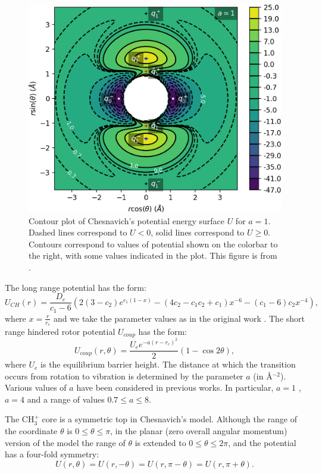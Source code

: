 \documentclass[a4paper]{article}
\begin{document}
\begin{figure}[ht]
 \centering
 \includegraphics[width=.5\textwidth]{figure1}
 \caption{Contour plot of Chesnavich's potential energy surface $U$ for $a=1$. Dashed lines correspond to $U<0$, solid lines correspond to $U\geq0$. Contours correspond to values of potential shown on the colorbar to the right, with some values indicated in the plot. This figure is from \cite{krajnak2018influence}.
 }
 \label{fig:pot}
\end{figure}

The long range potential has the form:
\begin{equation}\label{eq:UCH}
 U_{CH} (r) =  \frac{D_e}{c_1 - 6} \left( 2 (3-c_2) e^{c_1 (1-x)}  - \left( 4 c_2 - c_1 c_2 + c_1 \right) x^{-6} - (c_1 - 6) c_2 x^{-4} \right), 
\end{equation}
where $x = \frac{r}{r_e}$ and we take the  parameter values as  in the original work \cite{Chesnavich1986}.
The short range hindered rotor  potential $U_{coup}$ has the form:
\begin{equation}\label{eq:Ucoup}
 U_{coup} (r,\theta) = \frac{U_e e^{-a(r-r_e)^2}}{2} (1 - \cos 2 \theta ),
\end{equation}
where $U_e$ is the equilibrium barrier height. 
The distance at which the  transition occurs from rotation to vibration is 
determined by the parameter $a$ (in \AA$^{-2}$). 
Various values of $a$ have been considered in previous works. In particular,  
$a=1$ \cite{Chesnavich1986,mauguiere2014roaming,mauguiere2014multiple,krajnak2018phase}, 
$a=4$ \cite{Chesnavich1986,mauguiere2014roaming} and a range of values $0.7\leq a\leq 8$. \cite{krajnak2018influence}

The CH$_3^+$ core is a symmetric top in Chesnavich's model. 
Although the range of the coordinate $\theta$ is $0 \leq \theta \leq \pi$, 
in the planar (zero overall angular momentum) version of the model the range of $\theta$ 
is extended to $0 \leq \theta \leq 2 \pi$, and the potential has a four-fold symmetry:
\begin{equation}
U(r,\theta)=U(r,-\theta)=U(r,\pi-\theta)=U(r,\pi+\theta).
\label{eq:sym}
\end{equation}
\end{document}
